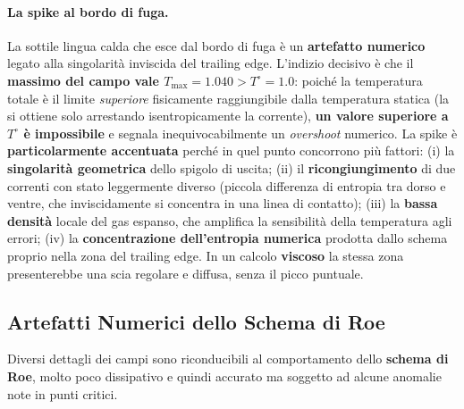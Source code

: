 \paragraph{La spike al bordo di fuga.}
La sottile lingua calda che esce dal bordo di fuga è un \textbf{artefatto numerico} legato alla
singolarità inviscida del trailing edge. L'indizio decisivo è che il \textbf{massimo del campo
vale $T_{\max} = 1.040 > T^\circ = 1.0$}: poiché la temperatura totale è il limite \emph{superiore}
fisicamente raggiungibile dalla temperatura statica (la si ottiene solo arrestando isentropicamente
la corrente), \textbf{un valore superiore a $T^\circ$ è impossibile} e segnala inequivocabilmente un
\emph{overshoot} numerico. La spike è \textbf{particolarmente accentuata} perché in quel punto
concorrono più fattori: (i) la \textbf{singolarità geometrica} dello spigolo di uscita; (ii) il
\textbf{ricongiungimento} di due correnti con stato leggermente diverso (piccola differenza di
entropia tra dorso e ventre, che inviscidamente si concentra in una linea di contatto); (iii) la
\textbf{bassa densità} locale del gas espanso, che amplifica la sensibilità della temperatura agli
errori; (iv) la \textbf{concentrazione dell'entropia numerica} prodotta dallo schema proprio nella
zona del trailing edge. In un calcolo \textbf{viscoso} la stessa zona presenterebbe una scia
regolare e diffusa, senza il picco puntuale.

\subsection{Artefatti Numerici dello Schema di Roe}
\label{sec:paletta_roe}

Diversi dettagli dei campi sono riconducibili al comportamento dello \textbf{schema di Roe}, molto
poco dissipativo e quindi accurato ma soggetto ad alcune anomalie note in punti critici.

